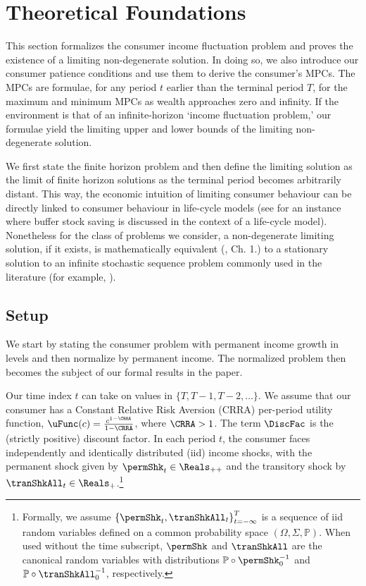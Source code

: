 \documentclass[BufferStockTheory]{subfiles}
\begin{document}
\hypertarget{The-Problem}{}
\section{Theoretical Foundations}\label{sec:Theory}

This section formalizes the consumer income fluctuation problem and proves the existence of a limiting non-degenerate solution. In doing so, we also introduce our consumer patience conditions and use them to derive the consumer's MPCs. The MPCs are formulae, for any period $t$ earlier than the terminal period $T$, for the maximum and minimum MPCs as wealth approaches zero and infinity.  If the environment is that of an infinite-horizon `income fluctuation problem,' our formulae yield the limiting upper and lower bounds of the limiting non-degenerate solution.


We first state the finite horizon problem and then define the limiting solution as the limit of finite horizon solutions as the terminal period becomes arbitrarily distant. This way, the economic intuition of limiting consumer behaviour can be directly linked to consumer behaviour in life-cycle models (see \cite{gpLifeCycle} for an instance where buffer stock saving is discussed in the context of a life-cycle model). Nonetheless for the class of problems we consider, a non-degenerate limiting solution, if it exists, is mathematically equivalent (\cite{bertsekas2012dynamic}, Ch. 1.) to a stationary solution to an infinite stochastic sequence problem commonly used in the literature (for example, \cite{mstIncFluct}). 

\label{sec:Foundations}
\subsection{Setup}\label{subsec:Setup}

We start by stating the consumer problem with permanent income growth in levels and then normalize by permanent income. The normalized problem then becomes the subject of our formal results in the paper. 

Our time index $t$ can take on values in $\{T,T-1,T-2,\dots \}$. We assume that our consumer has a Constant Relative Risk Aversion (CRRA) per-period utility function, $\uFunc(c)=\frac{c^{1-\CRRA}}{1-\CRRA}$, where $\CRRA>1$. The term $\DiscFac$ is the (strictly positive) discount factor. In each period $t$, the consumer faces independently and identically distributed (iid) income shocks, with the permanent shock given by $\permShk_{t} \in \Reals_{++}$ and the transitory shock by $\tranShkAll_{t} \in \Reals_{+}$.\footnote{Formally, we assume $\left\{\permShk_{t},\tranShkAll_{t}\right\}_{t=-\infty}^{T}$ is a sequence of iid random variables defined on a common probability space $(\Omega, \Sigma, \mathbb{P})$. When used without the time subscript, $\permShk$ and $\tranShkAll$ are the canonical random variables with distributions $\mathbb{P}\circ \permShk_{0}^{-1}$ and $\mathbb{P}\circ \tranShkAll_{0}^{-1}$, respectively.}
\end{document}

